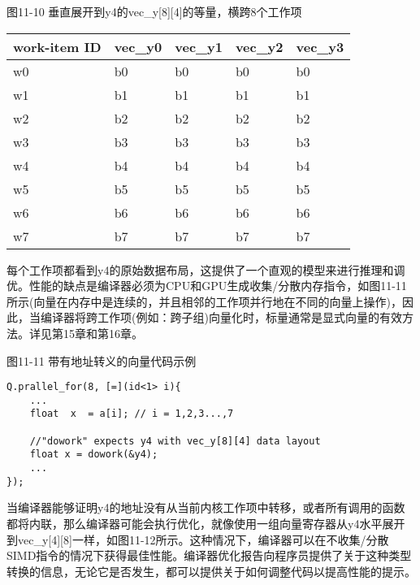 \hspace*{\fill} \par %
图11-10 垂直展开到y4的vec\_y[8][4]的等量，横跨8个工作项
\begin{table}[]
	\begin{tabular}{|l|l|l|l|l|}
		\hline
		work-item ID & vec\_y0 & vec\_y1 & vec\_y2 & vec\_y3 \\ \hline
		w0           & b0      & b0      & b0      & b0      \\ \hline
		w1           & b1      & b1      & b1      & b1      \\ \hline
		w2           & b2      & b2      & b2      & b2      \\ \hline
		w3           & b3      & b3      & b3      & b3      \\ \hline
		w4           & b4      & b4      & b4      & b4      \\ \hline
		w5           & b5      & b5      & b5      & b5      \\ \hline
		w6           & b6      & b6      & b6      & b6      \\ \hline
		w7           & b7      & b7      & b7      & b7      \\ \hline
	\end{tabular}
\end{table}

每个工作项都看到y4的原始数据布局，这提供了一个直观的模型来进行推理和调优。性能的缺点是编译器必须为CPU和GPU生成收集/分散内存指令，如图11-11所示(向量在内存中是连续的，并且相邻的工作项并行地在不同的向量上操作)，因此，当编译器将跨工作项(例如：跨子组)向量化时，标量通常是显式向量的有效方法。详见第15章和第16章。\par

\hspace*{\fill} \par %
图11-11 带有地址转义的向量代码示例
\begin{lstlisting}[caption={}]
Q.prallel_for(8, [=](id<1> i){
	...
	float  x  = a[i]; // i = 1,2,3...,7

	//"dowork" expects y4 with vec_y[8][4] data layout
	float x = dowork(&y4);
	...
});
\end{lstlisting}

当编译器能够证明y4的地址没有从当前内核工作项中转移，或者所有调用的函数都将内联，那么编译器可能会执行优化，就像使用一组向量寄存器从y4水平展开到vec\_y[4][8]一样，如图11-12所示。这种情况下，编译器可以在不收集/分散SIMD指令的情况下获得最佳性能。编译器优化报告向程序员提供了关于这种类型转换的信息，无论它是否发生，都可以提供关于如何调整代码以提高性能的提示。\par


